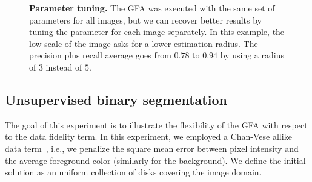 \documentclass[review]{siamart220329}
\begin{document}
\begin{figure}
\center
{}\hspace{1em}
\caption{\textbf{Parameter tuning.} The GFA was executed with the same set of parameters for all images, but we can recover better results by tuning the parameter for each image separately. In this example, the low scale of the image asks for a lower estimation radius. The precision plus recall average goes from $0.78$ to $0.94$ by using a radius of $3$ instead of $5$. }
\label{fig:coco-parameter-tuning}
\end{figure}
%
%
\subsection{Unsupervised binary segmentation}
The goal of this experiment is to illustrate the flexibility of the GFA with respect to the data fidelity term. In this experiment, we employed a Chan-Vese allike data term~\cite{chan01}, i.e., we penalize the square mean error between pixel intensity and the average foreground color (similarly for the background). We define the initial solution as an uniform collection of disks covering the image domain.
\end{document}
